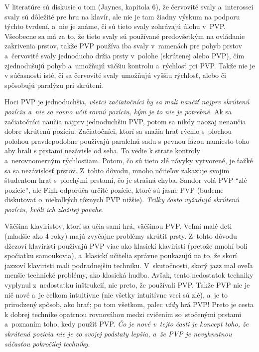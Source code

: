 V literatúre sú diskusie o tom (Jaynes, kapitola 6), že červovité svaly a~interossei svaly sú dôležité pre hru na klavír, ale nie je tam žiadny výskum na podporu týchto tvrdení, a~nie je známe, či sú tieto svaly zohrávajú úlohu v~PVP. Všeobecne sa má za to, že tieto svaly sú používané predovšetkým na ovládanie zakrivenia prstov, takže PVP používa iba svaly v~ramenách pre pohyb prstov a~červovité svaly jednoducho držia prsty v~polohe (skrútenej alebo PVP), čím zjednodušujú pohyb a~umožňujú väčšiu kontrolu a~rýchlosť pri PVP. Takže nie je v súčasnosti isté, či sa červovité svaly  umožňujú vyššiu rýchlosť, alebo či spôsobujú paralýzu pri skrútení. 

Hoci PVP je jednoduchšia, \emph{všetci začiatočníci by sa mali naučiť najprv skrútenú pozíciu  a~nie sa rovno učiť rovnú pozíciu, kým je to nie je potrebné.} Ak sa začiatočníci naučia najprv jednoduchšiu PVP, potom sa nikdy naozaj nenaučia dobre skrútenú pozíciu. Začiatočníci, ktorí sa snažia hrať rýchlo s~plochou polohou pravdepodobne používajú paralelnú sadu s pevnou fázou namiesto toho aby hrali s prstami nezávisle od seba. To vedie k strate kontroly a~nerovnomerným rýchlostiam. Potom, čo sú tieto zlé návyky vytvorené, je ťažké sa sa nezávislosť prstov. Z~tohto dôvodu, mnoho učiteľov zakazuje svojim študentom hrať s~plochými prstami, čo je strašná chyba. Sandor volá PVP “zlé pozície”, ale Fink odporúča určité pozície, ktoré sú jasne PVP (budeme diskutovať o~niekoľkých rôznych PVP nižšie). \emph{Trilky často vyžadujú skrútenú pozíciu, kvôli ich zložitej povahe.} 

Väčšina klaviristov, ktorí sa učia sami hrá, väčšinou PVP. Veľmi malé deti (mladšie ako 4 roky) majú zvyčajne problémy skrútiť prsty. Z~tohto dôvodu džezoví klaviristi používajú PVP viac ako klasickí klaviristi (pretože mnohí boli spočiatku samoukovia), a~klasickí učitelia správne poukazujú na to, že skorí jazzoví klaviristi mali podradnejšiu techniku. V~skutočnosti, skorý jazz mal oveľa menšie technické problémy, ako klasická hudba. Avšak, tento nedostatok techniky vyplynul z~nedostatku inštrukcií, nie preto, že používali PVP. Takže PVP nie je nič nové a~je celkom intuitívne (nie všetky intuitívne veci sú zlé), a~je to prirodzený spôsob, ako hrať; po tom všetkom, palec \textit{vždy} hrá PVP! Preto je cesta k dobrej technike opatrnou rovnováhou medzi cvičením so~stočenými prstami a~poznaním toho, kedy použiť PVP. \emph{Čo je nové v~tejto časti je koncept toho, že skrútená pozícia nie je zo svojej podstaty lepšia, a~že PVP je nevyhnutnou súčasťou pokročilej techniky.} 

